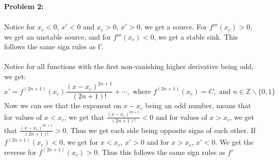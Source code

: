 \documentclass[11pt]{article}
\newenvironment{problem}[1]{\textbf{Problem #1: }}{\newpage}
\begin{document}
\begin{problem}{2}
\begin{enumerate}[label = (\alph*)]
\begin{align*}
 			\end{align*}
 			Notice for $x_c < 0$, $x' < 0$ and $x_c > 0$, $x' > 0$, we get a source.  For $f'''(x_c) > 0$, we get an unstable source, and for $f'''(x_c) < 0$, we get a stable sink.  This follows the same sign rules as f'.
 			\\ \\
 			Notice for all functions with the first non-vanishing higher derivative being odd, we get:
 			\[x' = f^{(2n + 1)}(x_c) \frac{(x-x_c)^{2n + 1}}{(2n + 1)!} + \cdots, \text{ where } f^{(2n + 1)}(x_c) = C, \text{ and } n \in \mathbb{Z}\backslash\{0,1\} \]
 			Now we can see that the exponent on $x-x_c$ being an odd number, means that for values of $x < x_c$, we get that $\frac{(x-x_c)^{2n + 1}}{(2n + 1)!} < 0$ and for values of $x > x_c$, we get that $\frac{(x-x_c)^{2n + 1}}{(2n + 1)!} > 0$. Thus we get each side being opposite signs of each other.  If $f^{(2n + 1)}(x_c) < 0$, we get for $x < x_c$, $x' > 0$ and for $x > x_c$, $x' < 0$. We get the reverse for $f^{(2n + 1)}(x_c) > 0$.  Thus this follows the same sign rules as $f'$
 		\end{enumerate}
	\end{problem}
\end{document}
